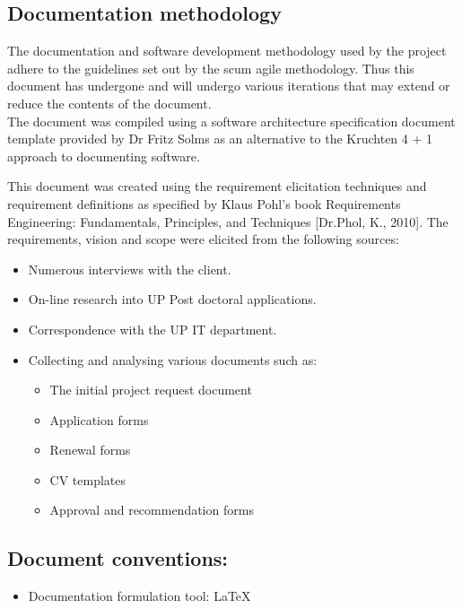 \documentclass[12pt]{article}
\begin{document}
\subsection{Documentation methodology}
\vspace{0.2in}
\begin{flushleft}
The documentation and software development methodology used by the project adhere to the guidelines set out by the scum agile methodology. Thus this document has undergone and will undergo various iterations that may extend or reduce the contents of the document.\\

The document was compiled using a software architecture specification document template provided by Dr Fritz Solms as an alternative to the Kruchten 4 + 1 approach to documenting software.

This document was created using the requirement elicitation techniques and requirement definitions as specified by Klaus Pohl’s book Requirements Engineering: Fundamentals, Principles, and Techniques [Dr.Phol, K., 2010].
The requirements, vision and scope were elicited from the following sources:
\begin{itemize}
	\item Numerous interviews with the client.
	\item On-line research into UP Post doctoral applications.
	\item Correspondence with the UP IT department.
	\item Collecting and analysing various documents such as:
		\begin{itemize}
			\item The initial project request document
			\item Application forms
			\item Renewal forms
			\item CV templates
			\item Approval and recommendation forms
		\end{itemize}
\end{itemize}
\end{flushleft}	

\vspace{0.5in}

\subsection{Document conventions:}
\vspace{0.1in}
\begin{itemize}
\item Documentation formulation tool: LaTeX
\end{itemize}
\end{document}

